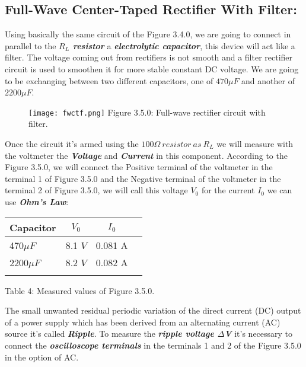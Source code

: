 \subsection{Full-Wave Center-Taped Rectifier With Filter:}

Using basically the same circuit of the Figure 3.4.0, we are going to connect in parallel to the {\bfseries\itshape $R_{L}$ resistor} a {\bfseries\itshape electrolytic capacitor}, this device will act like a filter. The voltage coming out from rectifiers is not smooth and a filter rectifier circuit is used to smoothen it for more stable constant DC voltage. We are going to be exchanging between two different capacitors, one of $470\mu F$ and another of $2200\mu F$.

\begin{figure}[H]
\texttt{[image: fwctf.png]}
\centering \linebreak \linebreak Figure 3.5.0: Full-wave rectifier circuit with filter.
\end{figure} 

Once the circuit it's armed using the $100\Omega\ resistor\ as\ R_{L}$ we will measure with the voltmeter the {\bfseries\itshape Voltage} and {\bfseries\itshape Current} in this component. According to the Figure 3.5.0, we will connect the Positive terminal of the voltmeter in the terminal 1 of Figure 3.5.0 and the Negative terminal of the voltmeter in the terminal 2 of Figure 3.5.0, we will call this voltage $V_{0}$ for the current $I_{0}$ we can use {\bfseries\itshape Ohm's Law}: \hfill \break

{\bfseries\itshape{}} \hfill \break

\begin{center}
\begin{tabular}[.5cm]{l c c c}
\toprule
Capacitor & $V_{0}$ & $I_{0}$ \\
\midrule
470$\mu F$ & 8.1 $V$ & 0.081 A \\
\cmidrule{1-3}
2200$\mu F$ & 8.2 $V$ & 0.082 A \\
\bottomrule
\linebreak
\end{tabular}
\centering \linebreak Table 4: Measured values of Figure 3.5.0.
\end{center} \hfill

The small unwanted residual periodic variation of the direct current (DC) output of a power supply which has been derived from an alternating current (AC) source it's called {\bfseries\itshape Ripple}. To measure the {\bfseries\itshape ripple voltage $\Delta$V} it's necessary to connect the {\bfseries\itshape oscilloscope terminals} in the terminals 1 and 2 of the Figure 3.5.0 in the option of AC.

